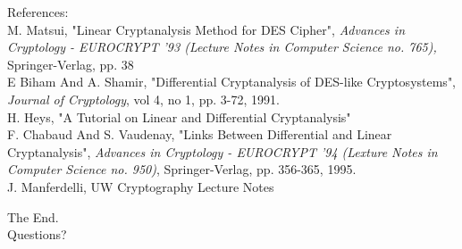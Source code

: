\documentclass[9pt]{beamer}
\begin{document}
\begin{frame}
References:\\
\vspace{5mm}
M. Matsui, "Linear Cryptanalysis Method for DES Cipher", \textit{Advances in Cryptology - EUROCRYPT '93 (Lecture Notes in Computer Science no. 765),} Springer-Verlag, pp. 38\\
\vspace{2mm}
E Biham And A. Shamir, "Differential Cryptanalysis of DES-like Cryptosystems", \textit{Journal of Cryptology}, vol 4, no 1, pp. 3-72, 1991.\\
\vspace{2mm}
H. Heys, "A Tutorial on Linear and Differential Cryptanalysis"\\
\vspace{2mm}
F. Chabaud And S. Vaudenay, "Links Between Differential and Linear Cryptanalysis", \textit{Advances in Cryptology - EUROCRYPT '94 (Lexture Notes in Computer Science no. 950)}, Springer-Verlag, pp. 356-365, 1995.\\
\vspace{2mm}
J. Manferdelli, UW Cryptography Lecture Notes
\end{frame}

\begin{frame}
\begin{center}
The End.\\
Questions?
\end{center}
\end{frame}
\end{document}
